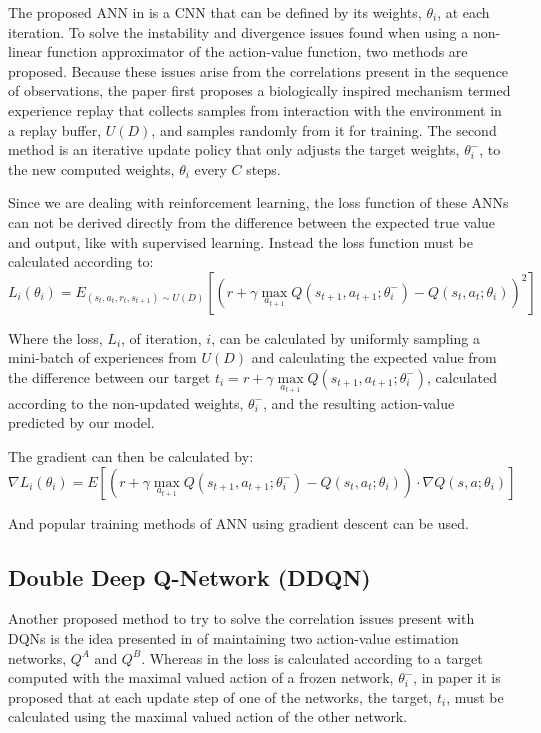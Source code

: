 The proposed ANN in \cite{DQN} is a CNN that can be defined by its weights, $\theta_i$, at each iteration. To solve the instability and divergence issues found when using a non-linear function approximator of the action-value function, two methods are proposed. Because these issues arise from the correlations present in the sequence of observations, the paper first proposes a biologically inspired mechanism termed experience replay that collects samples from interaction with the environment in a replay buffer, $U(D)$, and samples randomly from it for training. The second method is an iterative update policy that only adjusts the target weights, $\theta_i^-$, to the new computed weights, $\theta_i$ every $C$ steps.

Since we are dealing with reinforcement learning, the loss function of these \acrshort{ANNs} can not be derived directly from the difference between the expected true value and output, like with supervised learning. Instead the loss function must be calculated according to:
\begin{equation}
    L_i(\theta_i) = E_{(s_t, a_t, r_t, s_{t+1})\sim U(D)} [(r+\gamma \max\limits_{a_{t+1}} Q(s_{t+1}, a_{t+1};\theta_i^-) - Q(s_t, a_t; \theta_i))^2]
\end{equation}

Where the loss, $L_i$, of iteration, $i$, can be calculated by uniformly sampling a mini-batch of experiences from $U(D)$ and calculating the expected value from the difference between our target $t_i=r+\gamma\max\limits_{a_{t+1}} Q(s_{t+1}, a_{t+1};\theta_i^-)$, calculated according to the non-updated weights, $\theta_i^-$, and the resulting action-value predicted by our model.

The gradient can then be calculated by:
\begin{equation}
\nabla L_i(\theta_i) = E [(r+\gamma \max\limits_{a_{t+1}} Q(s_{t+1}, a_{t+1};\theta_i^-) - Q(s_t, a_t; \theta_i))\cdot\nabla Q(s, a;\theta_i)]
\end{equation}

And popular training methods of ANN using gradient descent can be used.

\subsection{Double Deep Q-Network (DDQN)}
\noindent Another proposed method to try to solve the correlation issues present with \acrshort{DQN}s is the idea presented in \cite{doubleDQN} of maintaining two action-value estimation networks, $Q^A$ and $Q^B$. Whereas in \cite{DQN} the loss is calculated according to a target computed with the maximal valued action of a frozen network, $\theta_i^-$, in paper \cite{doubleDQN} it is proposed that at each update step of one of the networks, the target, $t_i$, must be calculated using the maximal valued action of the other network.

